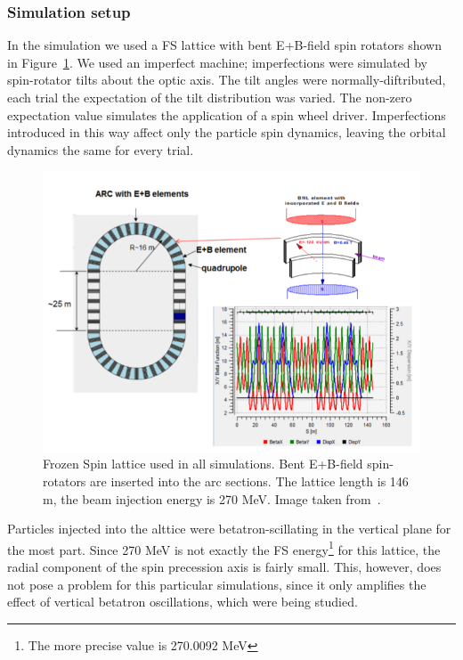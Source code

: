 \documentclass[preprint, review]{elsarticle}
\begin{document}
\subsubsection{Simulation setup}\label{sec:betatron:simulation}
In the simulation we used a FS lattice with bent E+B-field spin rotators
shown in Figure~\ref{fig:BNL_lattice}.
We used an imperfect machine; imperfections were simulated by spin-rotator tilts about the optic axis.
The tilt angles were normally-diftributed, each trial the expectation of the tilt distribution was varied.
The non-zero expectation value simulates the application of a spin wheel driver.
Imperfections introduced in this way affect only the particle spin dynamics,
leaving the orbital dynamics the same for every trial.

\begin{figure}[h]
  \includegraphics[width=\linewidth]{img/BNL_lattice}
  \caption{Frozen Spin lattice used in all simulations. Bent E+B-field spin-rotators are inserted
    into the arc sections. The lattice length is 146 m,
    the beam injection energy is 270 MeV. Image taken from~\cite{Senichev:Lattices}.\label{fig:BNL_lattice}}
\end{figure}


Particles injected into the alttice were betatron-scillating in the vertical plane for the most part.
Since 270 MeV is not exactly the FS energy\footnote{The more precise value is 270.0092 MeV}
for this lattice, the radial component of the spin precession axis is fairly small. This, however,
does not pose a problem for this particular simulations, since it only amplifies the effect of vertical
betatron oscillations, which were being studied.
\end{document}
